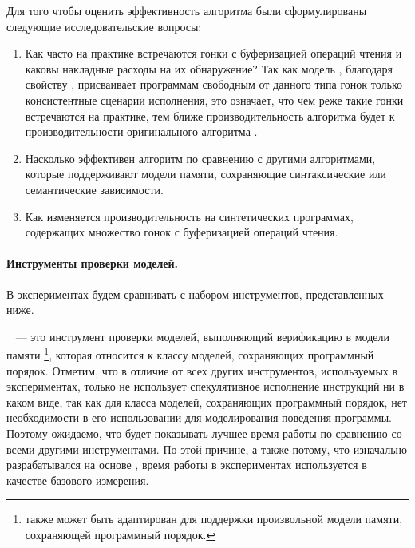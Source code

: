 Для того чтобы оценить эффективность алгоритма \wmc были 
сформулированы следующие исследовательские вопросы:
\begin{enumerate}

  \item Как часто на практике встречаются гонки с буферизацией операций чтения
    и каковы накладные расходы на их обнаружение?
    Так как модель \WkmS, благодаря свойству \LBRF, присваивает 
    программам свободным от данного типа гонок только \RCMM консистентные сценарии исполнения, 
    это означает, что чем реже такие гонки встречаются на практике, 
    тем ближе производительность алгоритма \wmc 
    будет к производительности оригинального алгоритма \genmc.

  \item Насколько эффективен алгоритм \wmc по сравнению 
    с другими алгоритмами, которые поддерживают 
    модели памяти, сохраняющие синтаксические или семантические зависимости. 

  \item Как изменяется производительность \wmc на синтетических программах, 
    содержащих множество гонок с буферизацией операций чтения. 
    
\end{enumerate}

\paragraph{Инструменты проверки моделей.}

В экспериментах будем сравнивать \wmc с набором инструментов, 
представленных ниже. 

\textbf{\genmc}~\cite{Kokologiannakis:PLDI2019,Kokologiannakis:CAD2021} ---
это инструмент проверки моделей, выполняющий верификацию в модели памяти \RCMM%
\footnote{\genmc также может быть адаптирован для поддержки 
  произвольной модели памяти, сохраняющей программный порядок.}, 
которая относится к классу моделей, сохраняющих программный порядок.  
Отметим, что в отличие от всех других инструментов, используемых в экспериментах, 
только \genmc не использует спекулятивное исполнение инструкций 
ни в каком виде, так как для класса моделей, сохраняющих программный порядок,
нет необходимости в его использовании для моделирования поведения программы. 
Поэтому ожидаемо, что \genmc будет показывать 
лучшее время работы по сравнению со всеми другими инструментами. 
По этой причине, а также потому, что \wmc изначально разрабатывался 
на основе \genmc, время работы \genmc в экспериментах 
используется в качестве базового измерения. 

